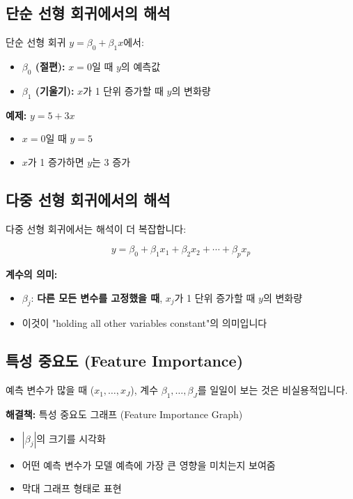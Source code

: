\documentclass[12pt]{article}
\begin{document}
\subsection{단순 선형 회귀에서의 해석}

단순 선형 회귀 $y = \beta_0 + \beta_1 x$에서:

\begin{itemize}
    \item \textbf{$\beta_0$ (절편):} $x=0$일 때 $y$의 예측값
    \item \textbf{$\beta_1$ (기울기):} $x$가 1 단위 증가할 때 $y$의 변화량
\end{itemize}

\textbf{예제:} $y = 5 + 3x$
\begin{itemize}
    \item $x=0$일 때 $y=5$
    \item $x$가 1 증가하면 $y$는 3 증가
\end{itemize}

\subsection{다중 선형 회귀에서의 해석}

다중 선형 회귀에서는 해석이 더 복잡합니다:

\begin{equation}
y = \beta_0 + \beta_1 x_1 + \beta_2 x_2 + \cdots + \beta_p x_p
\end{equation}

\textbf{계수의 의미:}
\begin{itemize}
    \item $\beta_j$: \textbf{다른 모든 변수를 고정했을 때}, $x_j$가 1 단위 증가할 때 $y$의 변화량
    \item 이것이 "holding all other variables constant"의 의미입니다
\end{itemize}

\subsection{특성 중요도 (Feature Importance)}

예측 변수가 많을 때 ($x_1, \ldots, x_J$), 계수 $\beta_1, \ldots, \beta_J$를 일일이 보는 것은 비실용적입니다.

\textbf{해결책:} 특성 중요도 그래프 (Feature Importance Graph)
\begin{itemize}
    \item $|\beta_j|$의 크기를 시각화
    \item 어떤 예측 변수가 모델 예측에 가장 큰 영향을 미치는지 보여줌
    \item 막대 그래프 형태로 표현
\end{itemize}
\end{document}
